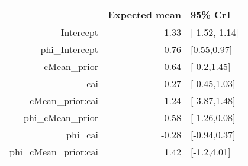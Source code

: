 \begin{tabular}{rrl}
  \hline
 & Expected mean & 95\% CrI \\ 
  \hline
Intercept & -1.33 & [-1.52,-1.14] \\ 
  phi\_Intercept & 0.76 & [0.55,0.97] \\ 
  cMean\_prior & 0.64 & [-0.2,1.45] \\ 
  cai & 0.27 & [-0.45,1.03] \\ 
  cMean\_prior:cai & -1.24 & [-3.87,1.48] \\ 
  phi\_cMean\_prior & -0.58 & [-1.26,0.08] \\ 
  phi\_cai & -0.28 & [-0.94,0.37] \\ 
  phi\_cMean\_prior:cai & 1.42 & [-1.2,4.01] \\ 
   \hline
\end{tabular}

